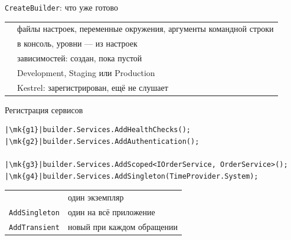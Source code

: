 \documentclass[aspectratio=169,10pt,t]{beamer}
\newcommand{\codexs}{\ttfamily\fontsize{7.0}{8.3}\selectfont}
\newcommand{\mk}[1]{\tikz[remember picture,overlay]\coordinate (#1) at (0,0.55ex);}
\begin{document}
\begin{frame}{\texttt{CreateBuilder}: что уже готово}
  \slidetop

  {\renewcommand{\arraystretch}{1.5}
  \begin{tabular}{@{}L{3.6cm}L{9.2cm}@{}}
     & файлы настроек, переменные окружения, аргументы
      командной строки \\
      & в консоль, уровни --- из настроек \\
        & зависимостей: создан, пока пустой \\
        & Development, Staging или Production \\
           & Kestrel: зарегистрирован, ещё не слушает \\
  \end{tabular}}

  \slidegap
\end{frame}

\begin{frame}[fragile]{Регистрация сервисов}
  \slidetop

\begin{lstlisting}[style=csharp,basicstyle=\codexs,escapechar=|]
|\mk{g1}|builder.Services.AddHealthChecks();
|\mk{g2}|builder.Services.AddAuthentication();

|\mk{g3}|builder.Services.AddScoped<IOrderService, OrderService>();
|\mk{g4}|builder.Services.AddSingleton(TimeProvider.System);
\end{lstlisting}

  {\renewcommand{\arraystretch}{1.2}\small
  \begin{tabular}{@{}L{3.0cm}L{9.8cm}@{}}
        & один экземпляр  \\
    \texttt{AddSingleton}      & один на всё приложение \\
    \texttt{AddTransient}      & новый при каждом обращении \\
  \end{tabular}}

\end{frame}
\end{document}
